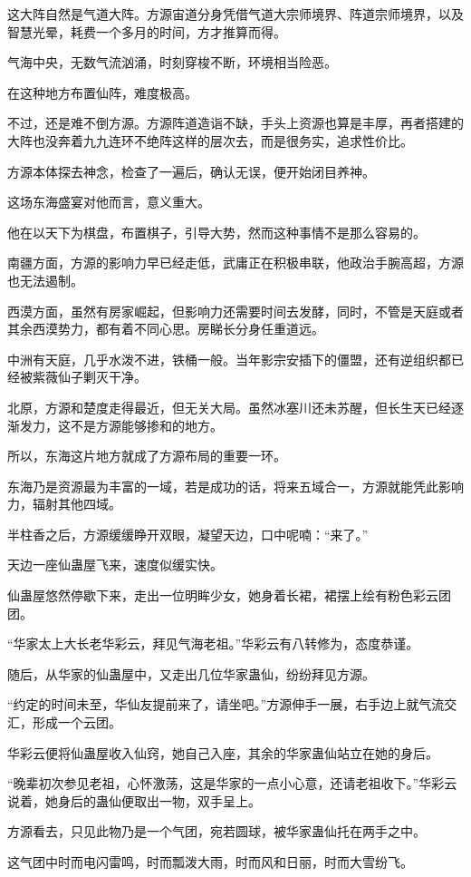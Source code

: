 \begin{this_body}
这大阵自然是气道大阵。方源宙道分身凭借气道大宗师境界、阵道宗师境界，以及智慧光晕，耗费一个多月的时间，方才推算而得。

气海中央，无数气流汹涌，时刻穿梭不断，环境相当险恶。

在这种地方布置仙阵，难度极高。

不过，还是难不倒方源。方源阵道造诣不缺，手头上资源也算是丰厚，再者搭建的大阵也没奔着九九连环不绝阵这样的层次去，而是很务实，追求性价比。

方源本体探去神念，检查了一遍后，确认无误，便开始闭目养神。

这场东海盛宴对他而言，意义重大。

他在以天下为棋盘，布置棋子，引导大势，然而这种事情不是那么容易的。

南疆方面，方源的影响力早已经走低，武庸正在积极串联，他政治手腕高超，方源也无法遏制。

西漠方面，虽然有房家崛起，但影响力还需要时间去发酵，同时，不管是天庭或者其余西漠势力，都有着不同心思。房睇长分身任重道远。

中洲有天庭，几乎水泼不进，铁桶一般。当年影宗安插下的僵盟，还有逆组织都已经被紫薇仙子剿灭干净。

北原，方源和楚度走得最近，但无关大局。虽然冰塞川还未苏醒，但长生天已经逐渐发力，这不是方源能够掺和的地方。

所以，东海这片地方就成了方源布局的重要一环。

东海乃是资源最为丰富的一域，若是成功的话，将来五域合一，方源就能凭此影响力，辐射其他四域。

半柱香之后，方源缓缓睁开双眼，凝望天边，口中呢喃：“来了。”

天边一座仙蛊屋飞来，速度似缓实快。

仙蛊屋悠然停歇下来，走出一位明眸少女，她身着长裙，裙摆上绘有粉色彩云团团。

“华家太上大长老华彩云，拜见气海老祖。”华彩云有八转修为，态度恭谨。

随后，从华家的仙蛊屋中，又走出几位华家蛊仙，纷纷拜见方源。

“约定的时间未至，华仙友提前来了，请坐吧。”方源伸手一展，右手边上就气流交汇，形成一个云团。

华彩云便将仙蛊屋收入仙窍，她自己入座，其余的华家蛊仙站立在她的身后。

“晚辈初次参见老祖，心怀激荡，这是华家的一点小心意，还请老祖收下。”华彩云说着，她身后的蛊仙便取出一物，双手呈上。

方源看去，只见此物乃是一个气团，宛若圆球，被华家蛊仙托在两手之中。

这气团中时而电闪雷鸣，时而瓢泼大雨，时而风和日丽，时而大雪纷飞。


\end{this_body}
